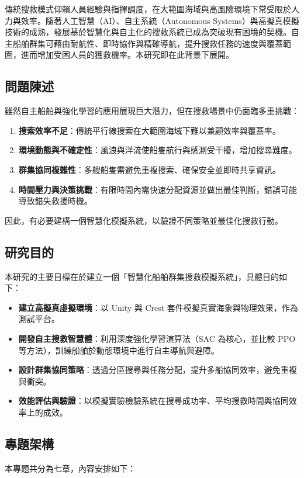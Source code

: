 \documentclass[12pt,a4paper]{ctexart}
\begin{document}
傳統搜救模式仰賴人員經驗與指揮調度，在大範圍海域與高風險環境下常受限於人力與效率。隨著人工智慧（AI）、自主系統（Autonomous Systems）與高擬真模擬技術的成熟，發展基於智慧化與自主化的搜救系統已成為突破現有困境的契機。自主船舶群集可藉由耐航性、即時協作與精確導航，提升搜救任務的速度與覆蓋範圍，進而增加受困人員的獲救機率。本研究即在此背景下展開。

\subsection{問題陳述}
雖然自主船舶與強化學習的應用展現巨大潛力，但在搜救場景中仍面臨多重挑戰：

\begin{enumerate}
\item \textbf{搜索效率不足}：傳統平行線搜索在大範圍海域下難以兼顧效率與覆蓋率。
\item \textbf{環境動態與不確定性}：風浪與洋流使船隻航行與感測受干擾，增加搜尋難度。
\item \textbf{群集協同複雜性}：多艘船隻需避免重複搜索、確保安全並即時共享資訊。
\item \textbf{時間壓力與決策挑戰}：有限時間內需快速分配資源並做出最佳判斷，錯誤可能導致錯失救援時機。
\end{enumerate}

因此，有必要建構一個智慧化模擬系統，以驗證不同策略並最佳化搜救行動。

\subsection{研究目的}
本研究的主要目標在於建立一個「智慧化船舶群集搜救模擬系統」，具體目的如下：

\begin{itemize}
\item \textbf{建立高擬真虛擬環境}：以 Unity 與 Crest 套件模擬真實海象與物理效果，作為測試平台。
\item \textbf{開發自主搜救智慧體}：利用深度強化學習演算法（SAC 為核心，並比較 PPO 等方法），訓練船舶於動態環境中進行自主導航與避障。
\item \textbf{設計群集協同策略}：透過分區搜尋與任務分配，提升多船協同效率，避免重複與衝突。
\item \textbf{效能評估與驗證}：以模擬實驗檢驗系統在搜尋成功率、平均搜救時間與協同效率上的成效。
\end{itemize}

\subsection{專題架構}
本專題共分為七章，內容安排如下：
\end{document}
